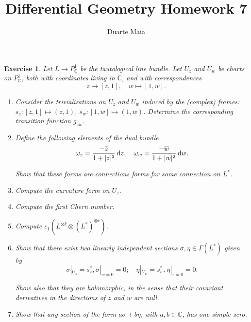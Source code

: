 \documentclass{article}
\title{Differential Geometry Homework 7}
\author{Duarte Maia}
\date{}
\newtheorem{ex}{Exercise}
\theoremstyle{nonumberplain}
\newcommand{\C}{\mathbb{C}}
\DeclarePairedDelimiter{\abs}{\lvert}{\rvert}
\newcommand{\pc}{P^1_\C}
\begin{document}
\maketitle

\begin{ex}
Let $L \to \pc$ be the tautological line bundle. Let $U_z$ and $U_w$ be charts on $\pc$, both with coordinates living in $\C$, and with correspondences
\[z \mapsto [z,1], \quad w \mapsto [1,w].\]

\begin{enumerate}
\item Consider the trivializations on $U_z$ and $U_w$ induced by the (complex) frames: $s_z \colon [z,1] \mapsto (z,1)$, $s_w \colon [1,w] \mapsto (1,w)$. Determine the corresponding transition function $g_{zw}$.

\item Define the following elements of the dual bundle
\[ \omega_z = \frac{-\overline{z}}{1+\abs{z}^2} \dl z, \quad \omega_w = \frac{-\overline{w}}{1+\abs{w}^2} \dl w.\]

Show that these forms are connections forms for some connection on $L^*$.

\item Compute the curvature form on $U_z$.

\item Compute the first Chern number.

\item Compute $\underline{c_1}(L^{\otimes k} \otimes (L^*)^{\otimes r})$.

\item Show that there exist two linearly independent sections $\sigma, \eta \in \Gamma(L^*)$ given by
\[\sigma|_{U_z} = s^*_z, \sigma|_{w=0} = 0; \quad \eta|_{U_w} = s^*_w, \eta|_{z=0} = 0.\]

Show also that they are holomorphic, in the sense that their covariant derivatives in the directions of $\overline{z}$ and $\overline{w}$ are null.

\item Show that any section of the form $a \sigma + b \eta$, with $a,b \in \C$, has one simple zero.
\end{enumerate}
\end{ex}
\end{document}
